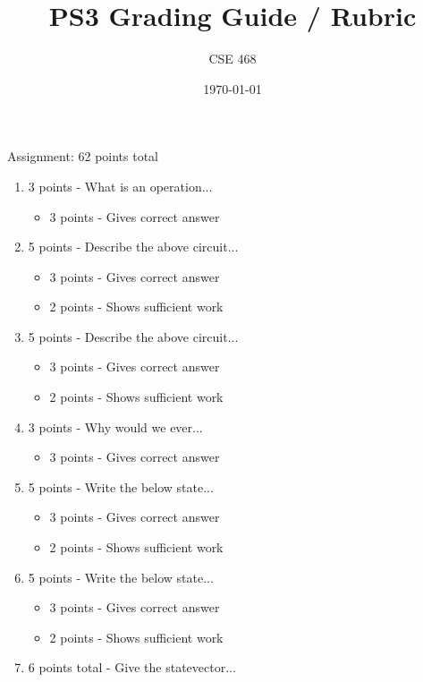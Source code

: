 \documentclass[12pt]{article}
\title{PS3 Grading Guide / Rubric}
\author{CSE 468}
\date{\today}
\begin{document}
\maketitle

Assignment: 62 points total
\begin{enumerate}[font=\bfseries]
    \item 3 points - What is an operation...
        \begin{itemize}
            \item 3 points - Gives correct answer
        \end{itemize}
    \item 5 points - Describe the above circuit...
        \begin{itemize}
            \item 3 points - Gives correct answer
            \item 2 points - Shows sufficient work
        \end{itemize}
    \item 5 points - Describe the above circuit...
        \begin{itemize}
            \item 3 points - Gives correct answer
            \item 2 points - Shows sufficient work
        \end{itemize}
    \item 3 points - Why would we ever...
        \begin{itemize}
            \item 3 points - Gives correct answer
        \end{itemize}
    \item 5 points - Write the below state...
        \begin{itemize}
            \item 3 points - Gives correct answer
            \item 2 points - Shows sufficient work
        \end{itemize}
    \item 5 points - Write the below state...
        \begin{itemize}
            \item 3 points - Gives correct answer
            \item 2 points - Shows sufficient work
        \end{itemize}
    \item 6 points total - Give the statevector...
        \begin{enumerate}

\end{enumerate}
\end{enumerate}
\end{document}
